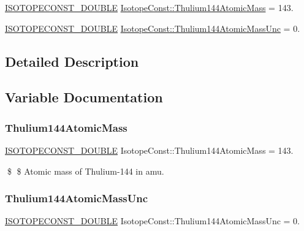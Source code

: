\begin{DoxyCompactItemize}
\item 
\mbox{\hyperlink{group___isotope_const-_macros_ga8f45a7272ce02c0b4c65c44636ed719a}{I\+S\+O\+T\+O\+P\+E\+C\+O\+N\+S\+T\+\_\+\+D\+O\+U\+B\+LE}} \mbox{\hyperlink{group___isotope_const-_thulium-_tm144_ga9cc17f5232dedf34c5f48515fac01204}{Isotope\+Const\+::\+Thulium144\+Atomic\+Mass}} = 143.
\item 
\mbox{\hyperlink{group___isotope_const-_macros_ga8f45a7272ce02c0b4c65c44636ed719a}{I\+S\+O\+T\+O\+P\+E\+C\+O\+N\+S\+T\+\_\+\+D\+O\+U\+B\+LE}} \mbox{\hyperlink{group___isotope_const-_thulium-_tm144_gaec6a28b51c600ab1b93beaef42fa5da4}{Isotope\+Const\+::\+Thulium144\+Atomic\+Mass\+Unc}} = 0.
\end{DoxyCompactItemize}


\subsection{Detailed Description}


\subsection{Variable Documentation}
\mbox{\label{group___isotope_const-_thulium-_tm144_ga9cc17f5232dedf34c5f48515fac01204}} 
\subsubsection{\texorpdfstring{Thulium144\+Atomic\+Mass}{Thulium144AtomicMass}}
{\footnotesize\ttfamily \mbox{\hyperlink{group___isotope_const-_macros_ga8f45a7272ce02c0b4c65c44636ed719a}{I\+S\+O\+T\+O\+P\+E\+C\+O\+N\+S\+T\+\_\+\+D\+O\+U\+B\+LE}} Isotope\+Const\+::\+Thulium144\+Atomic\+Mass = 143.}

\$ \$ Atomic mass of Thulium-\/144 in amu. \mbox{\label{group___isotope_const-_thulium-_tm144_gaec6a28b51c600ab1b93beaef42fa5da4}} 
\subsubsection{\texorpdfstring{Thulium144\+Atomic\+Mass\+Unc}{Thulium144AtomicMassUnc}}
{\footnotesize\ttfamily \mbox{\hyperlink{group___isotope_const-_macros_ga8f45a7272ce02c0b4c65c44636ed719a}{I\+S\+O\+T\+O\+P\+E\+C\+O\+N\+S\+T\+\_\+\+D\+O\+U\+B\+LE}} Isotope\+Const\+::\+Thulium144\+Atomic\+Mass\+Unc = 0.}

